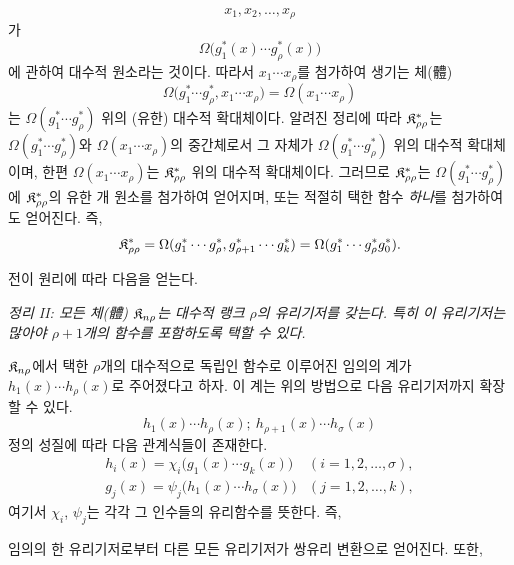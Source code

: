 \[
x_1,x_2,\ldots,x_\rho
\]
가
\[
\Omega\bigl(g_1^*(x)\cdots g_\rho^*(x)\bigr)
\]
에 관하여 대수적 원소라는 것이다. 따라서 $x_1\cdots x_\rho$를 첨가하여 생기는 체(體)
\[
\Omega\bigl(g_1^*\cdots g_\rho^*,x_1\cdots x_\rho\bigr)=\Omega(x_1\cdots x_\rho)
\]
는 $\Omega(g_1^*\cdots g_\rho^*)$ 위의 (유한) 대수적 확대체이다. 알려진 정리에 따라 $\mathfrak K^*_{\rho\rho}$는 $\Omega(g_1^*\cdots g_\rho^*)$와 $\Omega(x_1\cdots x_\rho)$의 중간체로서 그 자체가 $\Omega(g_1^*\cdots g_\rho^*)$ 위의 대수적 확대체이며, 한편 $\Omega(x_1\cdots x_\rho)$는 $\mathfrak K^*_{\rho\rho}$ 위의 대수적 확대체이다. 그러므로 $\mathfrak K^*_{\rho\rho}$는 $\Omega(g_1^*\cdots g_\rho^*)$에 $\mathfrak K^*_{\rho\rho}$의 유한 개 원소를 첨가하여 얻어지며, 또는 적절히 택한 함수 \emph{하나}를 첨가하여도 얻어진다. 즉,
\[
\mathfrak K^*_{\rho\rho}
=\Omega(g_1^*\cdots g_\rho^*,g_{\rho+1}^*\cdots g_k^*)
=\Omega(g_1^*\cdots g_\rho^*g_0^*).
\]

전이 원리에 따라 다음을 얻는다.

\emph{정리 II: 모든 체(體) $\mathfrak K_{n\rho}$는 대수적 랭크 $\rho$의 유리기저를 갖는다. 특히 이 유리기저는 많아야 $\rho+1$개의 함수를 포함하도록 택할 수 있다.}

$\mathfrak K_{n\rho}$에서 택한 $\rho$개의 대수적으로 독립인 함수로 이루어진 임의의 계가 $h_1(x)\cdots h_\rho(x)$로 주어졌다고 하자. 이 계는 위의 방법으로 다음 유리기저까지 확장할 수 있다.
\[
h_1(x)\cdots h_\rho(x);\ h_{\rho+1}(x)\cdots h_\sigma(x)
\]
정의 성질에 따라 다음 관계식들이 존재한다.
\[
\begin{array}{ll}
h_i(x)=\chi_i\bigl(g_1(x)\cdots g_k(x)\bigr)&(i=1,2,\ldots,\sigma),\\
g_j(x)=\psi_j\bigl(h_1(x)\cdots h_\sigma(x)\bigr)&(j=1,2,\ldots,k),
\end{array}
\]
여기서 $\chi_i$, $\psi_j$는 각각 그 인수들의 유리함수를 뜻한다. 즉,

임의의 한 유리기저로부터 다른 모든 유리기저가 쌍유리 변환으로 얻어진다. 또한,

